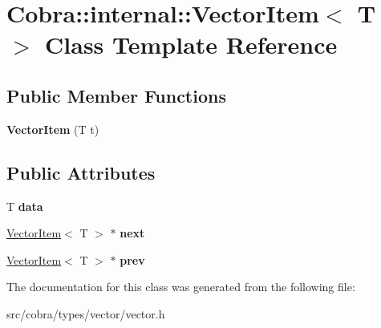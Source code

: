 \hypertarget{class_cobra_1_1internal_1_1_vector_item}{\section{Cobra\+:\+:internal\+:\+:Vector\+Item$<$ T $>$ Class Template Reference}
\label{class_cobra_1_1internal_1_1_vector_item}
}
\subsection*{Public Member Functions}
\begin{DoxyCompactItemize}
\item 
\hypertarget{class_cobra_1_1internal_1_1_vector_item_adff2008cc4f028e18f6852db4c3b8158}{{\bfseries Vector\+Item} (T t)}\label{class_cobra_1_1internal_1_1_vector_item_adff2008cc4f028e18f6852db4c3b8158}

\end{DoxyCompactItemize}
\subsection*{Public Attributes}
\begin{DoxyCompactItemize}
\item 
\hypertarget{class_cobra_1_1internal_1_1_vector_item_ab8b50de3d195269d516d522997b629e3}{T {\bfseries data}}\label{class_cobra_1_1internal_1_1_vector_item_ab8b50de3d195269d516d522997b629e3}

\item 
\hypertarget{class_cobra_1_1internal_1_1_vector_item_aeb10f98b2593a9158c613055e49f61d1}{\hyperlink{class_cobra_1_1internal_1_1_vector_item}{Vector\+Item}$<$ T $>$ $\ast$ {\bfseries next}}\label{class_cobra_1_1internal_1_1_vector_item_aeb10f98b2593a9158c613055e49f61d1}

\item 
\hypertarget{class_cobra_1_1internal_1_1_vector_item_a6fee8fdc2dfc96995216ddc7245cf7aa}{\hyperlink{class_cobra_1_1internal_1_1_vector_item}{Vector\+Item}$<$ T $>$ $\ast$ {\bfseries prev}}\label{class_cobra_1_1internal_1_1_vector_item_a6fee8fdc2dfc96995216ddc7245cf7aa}

\end{DoxyCompactItemize}


The documentation for this class was generated from the following file\+:\begin{DoxyCompactItemize}
\item 
src/cobra/types/vector/vector.\+h\end{DoxyCompactItemize}
